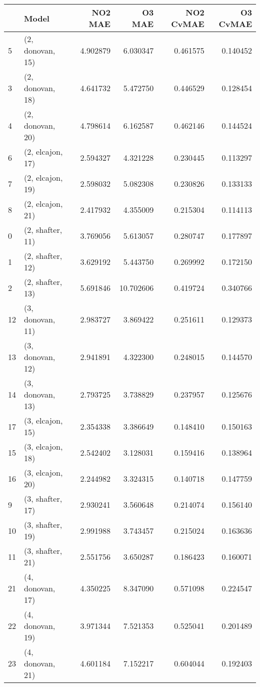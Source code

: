 \begin{tabular}{llrrrr}
\toprule
{} &             Model &    NO2 MAE &     O3 MAE &  NO2 CvMAE &  O3 CvMAE \\
\midrule
5  &  (2, donovan, 15) &   4.902879 &   6.030347 &   0.461575 &  0.140452 \\
3  &  (2, donovan, 18) &   4.641732 &   5.472750 &   0.446529 &  0.128454 \\
4  &  (2, donovan, 20) &   4.798614 &   6.162587 &   0.462146 &  0.144524 \\
6  &  (2, elcajon, 17) &   2.594327 &   4.321228 &   0.230445 &  0.113297 \\
7  &  (2, elcajon, 19) &   2.598032 &   5.082308 &   0.230826 &  0.133133 \\
8  &  (2, elcajon, 21) &   2.417932 &   4.355009 &   0.215304 &  0.114113 \\
0  &  (2, shafter, 11) &   3.769056 &   5.613057 &   0.280747 &  0.177897 \\
1  &  (2, shafter, 12) &   3.629192 &   5.443750 &   0.269992 &  0.172150 \\
2  &  (2, shafter, 13) &   5.691846 &  10.702606 &   0.419724 &  0.340766 \\
12 &  (3, donovan, 11) &   2.983727 &   3.869422 &   0.251611 &  0.129373 \\
13 &  (3, donovan, 12) &   2.941891 &   4.322300 &   0.248015 &  0.144570 \\
14 &  (3, donovan, 13) &   2.793725 &   3.738829 &   0.237957 &  0.125676 \\
17 &  (3, elcajon, 15) &   2.354338 &   3.386649 &   0.148410 &  0.150163 \\
15 &  (3, elcajon, 18) &   2.542402 &   3.128031 &   0.159416 &  0.138964 \\
16 &  (3, elcajon, 20) &   2.244982 &   3.324315 &   0.140718 &  0.147759 \\
9  &  (3, shafter, 17) &   2.930241 &   3.560648 &   0.214074 &  0.156140 \\
10 &  (3, shafter, 19) &   2.991988 &   3.743457 &   0.215024 &  0.163636 \\
11 &  (3, shafter, 21) &   2.551756 &   3.650287 &   0.186423 &  0.160071 \\
21 &  (4, donovan, 17) &   4.350225 &   8.347090 &   0.571098 &  0.224547 \\
22 &  (4, donovan, 19) &   3.971344 &   7.521353 &   0.525041 &  0.201489 \\
23 &  (4, donovan, 21) &   4.601184 &   7.152217 &   0.604044 &  0.192403 \\

\end{tabular}
